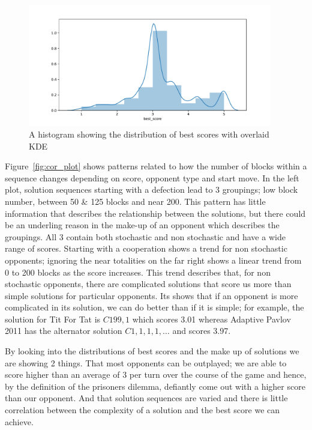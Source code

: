 \begin{figure}[ht]
    \includegraphics[width=0.95\textwidth, center]{./img/descriptive/best_score_hist.pdf}
    \caption{A histogram showing the distribution of best scores with overlaid KDE}\label{fig:best_score_hist}
\end{figure}

Figure~\ref{fig:cor_plot} shows patterns related to how the number of blocks within a sequence changes depending on score, opponent type and start move.
In the left plot, solution sequences starting with a defection lead to 3 groupings; low block number, between 50 \& 125 blocks and near 200.
This pattern has little information that describes the relationship between the solutions, but there could be an underling reason in the make-up of an opponent which describes the groupings.
All 3 contain both stochastic and non stochastic and have a wide range of scores.
Starting with a cooperation shows a trend for non stochastic opponents; ignoring the near totalities on the far right shows a linear trend from 0 to 200 blocks as the score increases.
This trend describes that, for non stochastic opponents, there are complicated solutions that score us more than simple solutions for particular opponents.
Its shows that if an opponent is more complicated in its solution, we can do better than if it is simple; for example, the solution for Tit For Tat is $C199,1$ which scores 3.01 whereas Adaptive Pavlov 2011 has the alternator solution $C1,1,1,1,\ldots$ and scores 3.97.

By looking into the distributions of best scores and the make up of solutions we are showing 2 things.
That most opponents can be outplayed; we are able to score higher than an average of 3 per turn over the course of the game and hence, by the definition of the prisoners dilemma, defiantly come out with a higher score than our opponent.
And that solution sequences are varied and there is little correlation between the complexity of a solution and the best score we can achieve. 

